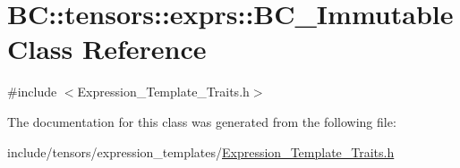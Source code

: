 \hypertarget{classBC_1_1tensors_1_1exprs_1_1BC__Immutable}{}\section{BC\+:\+:tensors\+:\+:exprs\+:\+:B\+C\+\_\+\+Immutable Class Reference}
\label{classBC_1_1tensors_1_1exprs_1_1BC__Immutable}


{\ttfamily \#include $<$Expression\+\_\+\+Template\+\_\+\+Traits.\+h$>$}



The documentation for this class was generated from the following file\+:\begin{DoxyCompactItemize}
\item 
include/tensors/expression\+\_\+templates/\hyperlink{Expression__Template__Traits_8h}{Expression\+\_\+\+Template\+\_\+\+Traits.\+h}\end{DoxyCompactItemize}
